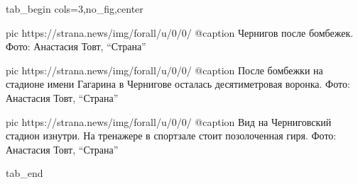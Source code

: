  
 
 
 
 


\ifcmt
  tab_begin cols=3,no_fig,center

     pic https://strana.news/img/forall/u/0/0/%
		 @caption Чернигов после бомбежек. Фото: Анастасия Товт, \enquote{Страна}

		 pic https://strana.news/img/forall/u/0/0/%
		 @caption После бомбежки на стадионе имени Гагарина в Чернигове осталась десятиметровая воронка. Фото: Анастасия Товт, \enquote{Страна}

		 pic https://strana.news/img/forall/u/0/0/%
		 @caption Вид на Черниговский стадион изнутри. На тренажере в спортзале стоит позолоченная гиря. Фото: Анастасия Товт, \enquote{Страна}

  tab_end
\fi
